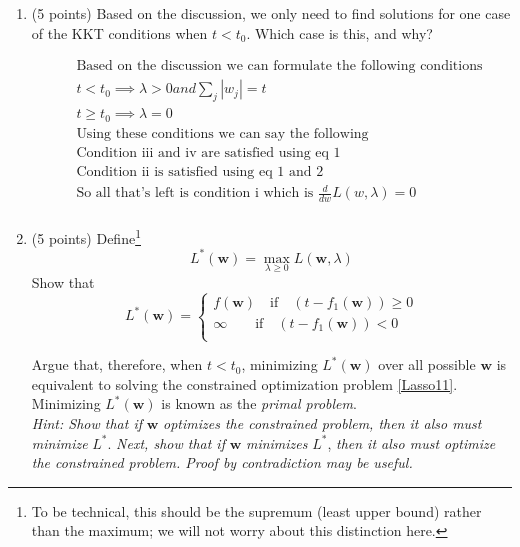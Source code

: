 \documentclass[english]{article}
\begin{document}
\begin{enumerate}
\item (5 points) Based on the discussion, we only need to find solutions for one case of the KKT conditions when $t<t_0$. Which case is this, and why?

\begin{align*}
	&\;\text{Based on the discussion we can formulate the following conditions} \\
	&\; t < t_0  \implies \lambda > 0 and \sum_j |w_j| = t \\
	&\; t \ge t_0 \implies \lambda = 0 \\
	&\;\text{Using these conditions we can say the following} \\
	&\;\text{Condition iii and iv are satisfied using eq 1} \\
	&\;\text{Condition ii is satisfied using eq 1 and 2} \\
	&\;\text{So all that's left is condition i which is } \frac{d}{dw} L(w,\lambda) = 0\\
\end{align*}

\item (5 points) Define\footnote{To be technical, this should be the supremum (least upper bound) rather than the maximum; we will not worry about this distinction here.}
\begin{equation}\label{primal}
\displaystyle L^*(\mathbf{w}) = \max_{\lambda \ge 0} L(\mathbf{w},\lambda)
\end{equation}
Show that 
\begin{equation}\label{primaleq}
L^*(\mathbf{w}) =\begin{cases} 
	f(\mathbf{w}) \quad \text{if} \quad (t - f_1(\mathbf{w})) \ge 0\\
	\infty \qquad \text{if} \quad (t - f_1(\mathbf{w})) < 0\\
\end{cases}
\end{equation}
	
Argue that, therefore, when $t<t_0$, minimizing $L^*(\mathbf{w})$ over all possible $\mathbf{w}$ is equivalent to solving the constrained optimization problem \ref{Lasso11}. Minimizing $L^*(\mathbf{w})$ is known as the \emph{primal problem}.\\
\emph{Hint: Show that if} $\mathbf{w}$ \emph{optimizes the constrained problem, then it also must minimize} $L^*$. \emph{Next, show that if} $\mathbf{w}$ \emph{minimizes} $L^*$, \emph{then it also must optimize the constrained problem. Proof by contradiction may be useful.}


\end{enumerate}
\end{document}
